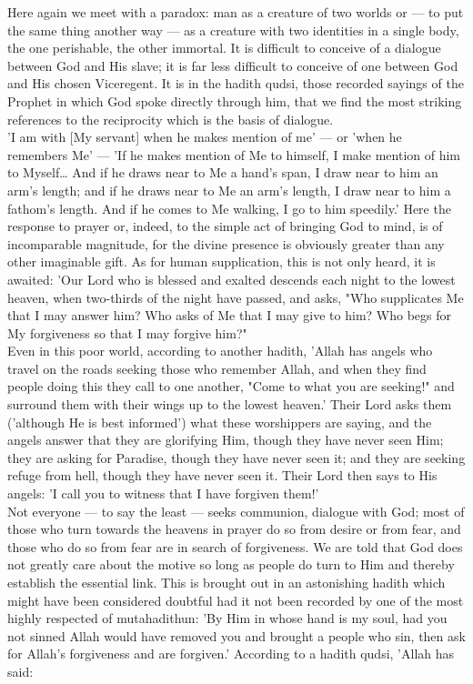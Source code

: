 \documentclass[11pt, b5paper, twoside]{book}
\begin{document}
Here again we meet with a paradox: man as a creature of two worlds or --- to put the same thing another 
way --- as a creature with two identities in a single body, the one perishable, the other immortal. It 
is difficult to conceive of a dialogue between God and His slave; it is far less difficult to 
conceive of one between God and His chosen Viceregent. It is in the hadith qudsi, those recorded 
sayings of the Prophet in which God spoke directly through him, that we find the most striking 
references to the reciprocity which is the basis of dialogue. \\

'I am with [My servant] when he makes mention of me' --- or 'when he remembers Me' --- 'If he makes 
mention of Me to himself, I make mention of him to Myself\ldots{} And if he draws near to Me a hand's 
span, I draw near to him an arm's length; and if he draws near to Me an arm's length, I draw near to 
him a fathom's length. And if he comes to Me walking, I go to him speedily.' Here the response to 
prayer or, indeed, to the simple act of bringing God to mind, is of incomparable magnitude, for the 
divine presence is obviously greater than any other imaginable gift. As for human supplication, this 
is not only heard, it is awaited: 'Our Lord who is blessed and exalted descends each night to the 
lowest heaven, when two-thirds of the night have passed, and asks, "Who supplicates Me that I may 
answer him? Who asks of Me that I may give to him? Who begs for My forgiveness so that I may forgive 
him?" \\

Even in this poor world, according to another hadith, 'Allah has angels who travel on the roads 
seeking those who remember Allah, and when they find people doing this they call to one another, 
"Come to what you are seeking!" and surround them with their wings up to the lowest heaven.' Their 
Lord asks them ('although He is best informed') what these worshippers are saying, and the angels 
answer that they are glorifying Him, though they have never seen Him; they are asking for Paradise, 
though they have never seen it; and they are seeking refuge from hell, though they have never seen 
it. Their Lord then says to His angels: 'I call you to witness that I have forgiven them!' \\

Not everyone --- to say the least --- seeks communion, dialogue with God; most of those who turn towards 
the heavens in prayer do so from desire or from fear, and those who do so from fear are in search of 
forgiveness. We are told that God does not greatly care about the motive so long as people do turn to 
Him and thereby establish the essential link. This is brought out in an astonishing hadith which 
might have been considered doubtful had it not been recorded by one of the most highly respected of 
mutahadithun: 'By Him in whose hand is my soul, had you not sinned Allah would have removed you and 
brought a people who sin, then ask for Allah's forgiveness and are forgiven.' According to a hadith 
qudsi, 'Allah has said: \\
\end{document}
